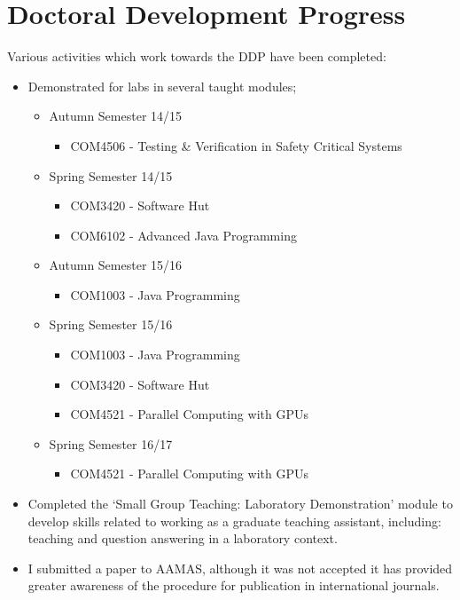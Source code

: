 \newpage
\chapter{Doctoral Development Progress\label{appendix:b}}
Various activities which work towards the DDP have been completed:
\begin{itemize}
  \item Demonstrated for labs in several taught modules;
  \begin{itemize}
    \item Autumn Semester 14/15
    \begin{itemize}
      \item COM4506 - Testing \& Verification in Safety Critical Systems
    \end{itemize}
    \item Spring Semester 14/15
    \begin{itemize}
      \item COM3420 - Software Hut
      \item COM6102 - Advanced Java Programming
    \end{itemize}
    \item Autumn Semester 15/16
    \begin{itemize}
      \item COM1003 - Java Programming
    \end{itemize}
    \item Spring Semester 15/16
    \begin{itemize}
      \item COM1003 - Java Programming
      \item COM3420 - Software Hut
      \item COM4521 - Parallel Computing with GPUs
    \end{itemize}
    \item Spring Semester 16/17
    \begin{itemize}
      \item COM4521 - Parallel Computing with GPUs
    \end{itemize}
  \end{itemize}
  \item Completed the `Small Group Teaching: Laboratory Demonstration' module to develop skills related to working as a graduate teaching assistant, including: teaching and question answering in a laboratory context.
  \item I submitted a paper to AAMAS, although it was not accepted it has provided greater awareness of the procedure for publication in international journals.

\end{itemize}
